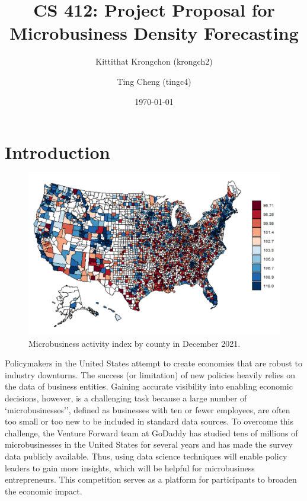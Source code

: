 \documentclass[prl,aps,superscriptaddress,twocolumn,11pt,nolongbibliography]{revtex4-2}
\begin{document}
\title{CS 412: Project Proposal for Microbusiness Density Forecasting}
\author{Kittithat Krongchon (krongch2)}
\author{Ting Cheng (tingc4)}
\date{\today}

\maketitle


\section{Introduction}
\begin{figure}
\includegraphics[width=5in]{figs/activity.png}
\caption{\label{fig:activity}
Microbusiness activity index by county in December 2021.
}
\end{figure}

Policymakers in the United States attempt to create economies that are robust to industry downturns. 
The success (or limitation) of new policies heavily relies on the data of business entities. 
Gaining accurate visibility into enabling economic decisions, however, is a challenging task because a large number of `microbusinesses'', defined as businesses with ten or fewer employees, are often too small or too new to be included in standard data sources.
To overcome this challenge, the Venture Forward team at GoDaddy has studied tens of millions of microbusinesses in the United States for several years and has made the survey data publicly available. 
Thus, using data science techniques will enable policy leaders to gain more insights, which will be helpful for microbusiness entrepreneurs. 
This competition serves as a platform for participants to broaden the economic impact. 
\end{document}
